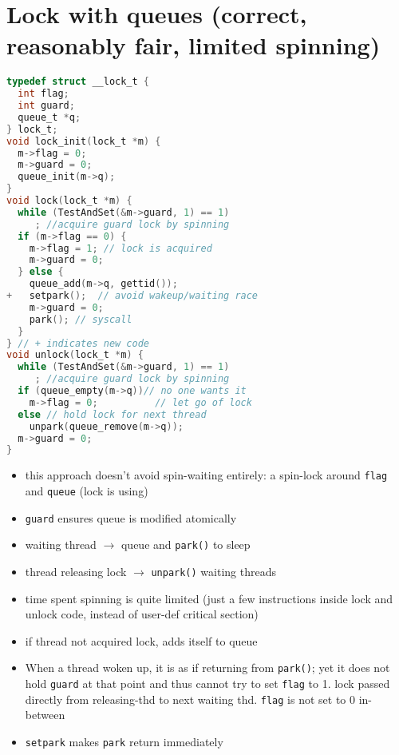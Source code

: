 \section*{Lock with queues (correct, reasonably fair, limited spinning)}
\begin{minipage}{.6\linewidth}
\begin{lstlisting}[language=c]
typedef struct __lock_t {
  int flag;
  int guard;
  queue_t *q;
} lock_t;
void lock_init(lock_t *m) {
  m->flag = 0;
  m->guard = 0;
  queue_init(m->q);
}
void lock(lock_t *m) {
  while (TestAndSet(&m->guard, 1) == 1)
     ; //acquire guard lock by spinning
  if (m->flag == 0) {
    m->flag = 1; // lock is acquired
    m->guard = 0;
  } else {
    queue_add(m->q, gettid());
+   setpark();  // avoid wakeup/waiting race
    m->guard = 0;
    park(); // syscall
  }
} // + indicates new code
void unlock(lock_t *m) {
  while (TestAndSet(&m->guard, 1) == 1)
     ; //acquire guard lock by spinning
  if (queue_empty(m->q))// no one wants it
    m->flag = 0;          // let go of lock
  else // hold lock for next thread
    unpark(queue_remove(m->q));
  m->guard = 0;
}
\end{lstlisting}
\end{minipage}
\begin{minipage}{.4\linewidth}
  \flushleft
  \begin{itemize}
  \item this approach doesn't avoid spin-waiting entirely: a spin-lock around \texttt{flag} and \texttt{queue} (lock is using)
  \item \texttt{guard} ensures queue is modified atomically
  \item waiting thread $\to$ queue and \texttt{park()} to sleep
  \item thread releasing lock $\to$ \texttt{unpark()} waiting threads
  \item time spent spinning is quite limited (just a few instructions inside lock and unlock code, instead of user-def critical section)
  \item if thread not acquired lock, adds itself to queue
  \item When a thread woken up, it is as if returning from \texttt{park()}; yet it does not hold \texttt{guard} at that point and thus cannot try to set \texttt{flag} to 1. lock passed directly from releasing-thd to next waiting thd. \texttt{flag} is not set to 0 in-between
  \item \texttt{setpark} makes \texttt{park} return immediately
  \end{itemize}
\end{minipage}
